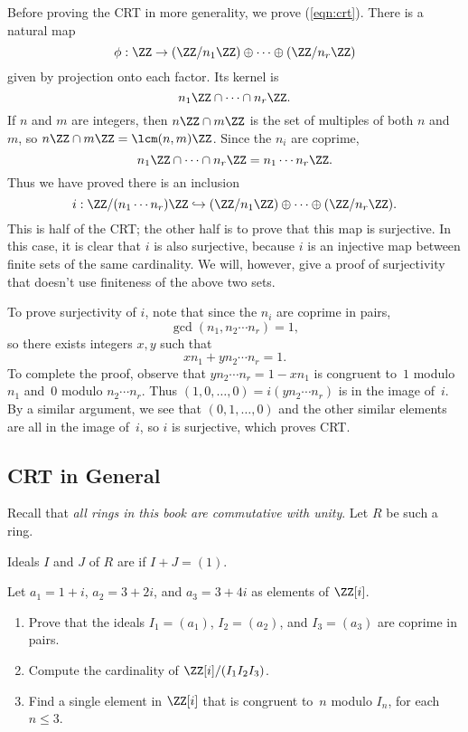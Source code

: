 Before proving the CRT in more generality, we prove
(\ref{eqn:crt}).
There is a natural map
$$
  \phi: \ZZ \to (\ZZ/n_1\ZZ)\oplus \cdots \oplus (\ZZ/n_r\ZZ)
$$
given by projection onto each factor.  Its kernel is
$$
 n_1 \ZZ \cap \cdots \cap n_r \ZZ.
$$
If $n$ and $m$ are integers, then $n\ZZ\cap m\ZZ$ is the
set of multiples of both $n$ and $m$, so $n\ZZ\cap m\ZZ = \lcm(n,m)\ZZ$.
Since the $n_i$ are coprime,
$$
 n_1 \ZZ \cap \cdots \cap n_r \ZZ = n_1 \cdots n_r \ZZ.
$$
Thus we have proved there is an inclusion
\begin{equation}\label{eqn:crt_inj}
 i: \ZZ/(n_1\cdots n_r)\ZZ \hookrightarrow (\ZZ/n_1\ZZ) \oplus \cdots \oplus (\ZZ/n_r\ZZ).
\end{equation}
This is half of the CRT; the other half is to prove that this map is
surjective.  In this case, it is clear that $i$ is also surjective,
because $i$ is an injective map between finite sets of the same cardinality.
We will, however, give a proof of surjectivity that doesn't use
finiteness of the above two sets.

To prove surjectivity of $i$, note that since the $n_i$ are coprime in
pairs, $$\gcd(n_1, n_2\cdots n_r)=1,$$ so there exists integers $x,y$
such that
$$
   x n_1 + y n_2\cdots n_r = 1.
$$
To complete the proof, observe that
$ y n_2\cdots n_r = 1 - x n_1$
is congruent to~$1$ modulo $n_1$ and~$0$ modulo $n_2\cdots n_r$.
Thus $(1,0, \dots,0) = i (y n_2\cdots n_r)$ is in the image of~$i$.
By a similar argument, we see that $(0,1, \dots,0)$ and the
other similar elements are all in the image of~$i$, so $i$
is surjective, which proves CRT.

\subsection{CRT in General}
Recall that {\em all rings in this book are commutative with unity}.
Let $R$ be such a ring.

\begin{definition}[Coprime]
  Ideals $I$ and $J$ of $R$ are  if $I+J=(1)$.
\end{definition}

\begin{exercise}
  Let $a_1 = 1+i$, $a_2 = 3+2i$, and $a_3 = 3+4i$ as elements of $\ZZ[i]$.
  \begin{enumerate}[label=(\alph*)]
    \item Prove that the ideals $I_1=(a_1)$, $I_2=(a_2)$, and $I_3=(a_3)$
    are coprime in pairs.
    \item Compute the cardinality of $\ZZ[i]/(I_1 I_2 I_3)$.
    \item Find a single element in $\ZZ[i]$ that is congruent to~$n$
    modulo $I_n$, for each $n\leq 3$.
  \end{enumerate}
\end{exercise}

